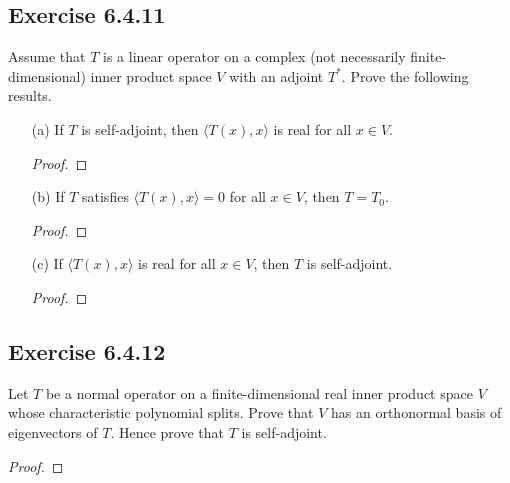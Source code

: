\subsection*{Exercise 6.4.11} Assume that \( T  \) is a linear operator on a complex (not necessarily finite-dimensional) inner product space \( V  \) with an adjoint \( T^{*} \). Prove the following results.
\begin{enumerate}
    \item[(a)] If \( T  \) is self-adjoint, then \( \langle T(x) , x \rangle \) is real for all \( x \in V  \).
        \begin{proof}
        
        \end{proof}
    \item[(b)] If \( T  \) satisfies \( \langle T(x) , x \rangle = 0  \) for all \( x \in V  \), then \( T = {T}_{0} \).
        \begin{proof}
        
        \end{proof}
    \item[(c)] If \( \langle T(x) , x \rangle  \) is real for all \( x \in V  \), then \( T  \) is self-adjoint.
        \begin{proof}
        
        \end{proof}
\end{enumerate}

\subsection*{Exercise 6.4.12} Let \( T  \) be a normal operator on a finite-dimensional real inner product space \( V  \) whose characteristic polynomial splits. Prove that \( V  \) has an orthonormal basis of eigenvectors of \( T  \). Hence prove that \( T  \) is self-adjoint.

\begin{proof}

\end{proof}

